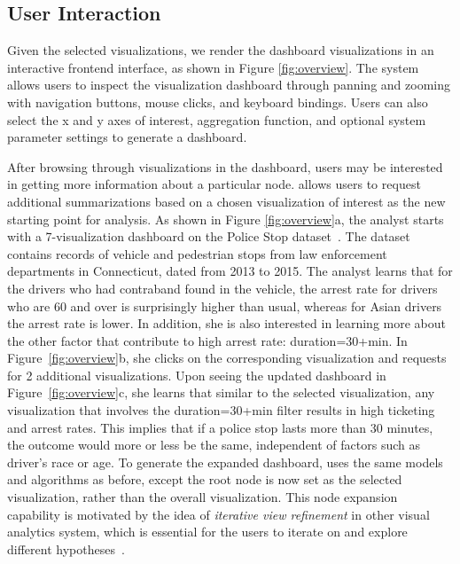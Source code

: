 \subsection{User Interaction\label{sec:interaction}}
\par Given the selected visualizations, we render the dashboard visualizations in an interactive frontend interface, as shown in Figure \ref{fig:overview}. The system allows users to inspect the visualization dashboard through panning and zooming with navigation buttons, mouse clicks, and keyboard bindings. Users can also select the x and y axes of interest, aggregation function, and optional system parameter settings to generate a dashboard.  
\par After browsing through visualizations in the dashboard, users may be interested in getting more information about a particular node. \system allows users to request additional summarizations based on a chosen visualization of interest as the new starting point for analysis. As shown in Figure \ref{fig:overview}a, the analyst starts with a 7-visualization dashboard on the Police Stop dataset~\cite{police}. The dataset contains records of vehicle and pedestrian stops from law enforcement departments in Connecticut, dated from 2013 to 2015. The analyst learns that for the drivers who had contraband found in the vehicle, the arrest rate for drivers who are 60 and over is surprisingly higher than usual, whereas for Asian drivers the arrest rate is lower. In addition, she is also interested in learning more about the other factor that contribute to high arrest rate: duration=30+min. In Figure~\ref{fig:overview}b, she clicks on the corresponding visualization and requests for 2 additional visualizations. Upon seeing the updated dashboard in Figure~\ref{fig:overview}c, she learns that similar to the selected visualization, any visualization that involves the duration=30+min filter results in high ticketing and arrest rates. This implies that if a police stop lasts more than 30 minutes, the outcome would more or less be the same, independent of factors such as driver's race or age. To generate the expanded dashboard, \system uses the same models and algorithms as before, except the root node is now set as the selected visualization, rather than the overall visualization. This node expansion capability is motivated by the idea of \textit{iterative view refinement} in other visual analytics system, which is essential for the users to iterate on and explore different hypotheses~\cite{Wongsuphasawat2016,Hoque2017}.

